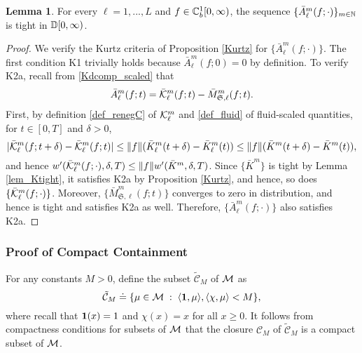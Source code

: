 \documentclass{article}
\theoremstyle{definition}
\newtheorem{lemma}[theorem]{Lemma}
\numberwithin{equation}{section}
\begin{document}
\begin{lemma}\label{lem_Atight}
For every $\ell=1,...,L$ and $f\in\mathbb{C}_b^{1}[0,\infty)$, the sequence $\{\bar A^m_\ell(f;\cdot)\}_{m\in\mathbb{N}}$ is tight in $\mathbb{D}[0,\infty)$.
\end{lemma}

\begin{proof}
We verify the Kurtz criteria of Proposition \ref{Kurtz} for $\{\bar A^m_\ell(f;\cdot)\}$. The first condition K1 trivially holds because $\bar A^m_\ell(f;0)=0$ by definition. To verify K2a, recall from \eqref{Kdcomp_scaled} that
\[
    \bar A^m_\ell(f;t)= \bar{\mathcal{K}}^m_\ell(f;t)-  \bar M^m_{\mathfrak{S},\ell}(f;t).
\]
First, by definition \eqref{def_renegC} of $\mathcal{K}^m_\ell$ and \eqref{def_fluid} of fluid-scaled quantities, for $t\in[0,T]$ and $\delta>0$,
\[
|\bar{\mathcal{K}}^m_\ell(f;t+\delta) - \bar{\mathcal{K}}^m_\ell(f;t)| \leq \|f\|(\bar K_\ell^m(t+\delta)-\bar K_\ell^m(t))\leq  \|f\|(\bar K^m(t+\delta)-\bar K^m(t)),
\]
and hence $w'(\bar{\mathcal{K}}^m_\ell(f;\cdot),\delta,T)\leq \|f\| w'(\bar K^m,\delta,T)$.  Since $\{\bar K^m\}$ is tight by Lemma \ref{lem_Ktight}, it satisfies K2a by Proposition \ref{Kurtz}, and hence, so does $\{\bar{\mathcal{K}}^m_\ell(f;\cdot)\}$. Moreover, $\{\bar M^m_{\mathfrak{S},\ell}(f;t)\}$ converges to zero in distribution, and hence is tight and satisfies K2a as well. Therefore, $\{\bar A^m_\ell(f;\cdot)\}$ also satisfies K2a.

\end{proof}


\subsubsection{Proof of Compact Containment}

For any constants $M>0$, define the subset $\tilde{\mathcal{C}}_M$ of $\mathcal{M}$ as
\[
\tilde{\mathcal{C}}_M \doteq \{\mu\in\Mset \;:\;  \langle\f1,\mu\rangle, \langle\chi,\mu\rangle < M \},
\]
where recall that $\f1(x)=1$ and $\chi(x)=x$ for all $x\geq0$. It follows from compactness conditions \cite[Theorem 4.2]{kallenberg} for subsets of $\mathcal{M}$ that the closure $\mathcal{C}_M$ of $\tilde{\mathcal{C}}_M$ is a compact subset of $\mathcal{M}$.
\end{document}
